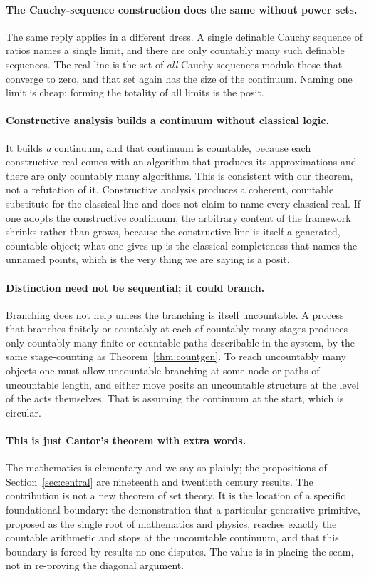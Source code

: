 \documentclass[11pt,a4paper]{article}
\theoremstyle{definition}
\theoremstyle{remark}
\begin{document}
\paragraph{The Cauchy-sequence construction does the same without power sets.}
The same reply applies in a different dress. A single definable Cauchy sequence
of ratios names a single limit, and there are only countably many such definable
sequences. The real line is the set of \emph{all} Cauchy sequences modulo those
that converge to zero, and that set again has the size of the continuum. Naming
one limit is cheap; forming the totality of all limits is the posit.

\paragraph{Constructive analysis builds a continuum without classical logic.}
It builds \emph{a} continuum, and that continuum is countable, because each
constructive real comes with an algorithm that produces its approximations and
there are only countably many algorithms. This is consistent with our theorem,
not a refutation of it. Constructive analysis produces a coherent, countable
substitute for the classical line and does not claim to name every classical
real. If one adopts the constructive continuum, the arbitrary content of the
framework shrinks rather than grows, because the constructive line is itself a
generated, countable object; what one gives up is the classical completeness that
names the unnamed points, which is the very thing we are saying is a posit.

\paragraph{Distinction need not be sequential; it could branch.}
Branching does not help unless the branching is itself uncountable. A process that
branches finitely or countably at each of countably many stages produces only
countably many finite or countable paths describable in the system, by the same
stage-counting as Theorem~\ref{thm:countgen}. To reach uncountably many objects
one must allow uncountable branching at some node or paths of uncountable length,
and either move posits an uncountable structure at the level of the acts
themselves. That is assuming the continuum at the start, which is circular.

\paragraph{This is just Cantor's theorem with extra words.}
The mathematics is elementary and we say so plainly; the propositions of
Section~\ref{sec:central} are nineteenth and twentieth century results. The
contribution is not a new theorem of set theory. It is the location of a specific
foundational boundary: the demonstration that a particular generative primitive,
proposed as the single root of mathematics and physics, reaches exactly the
countable arithmetic and stops at the uncountable continuum, and that this
boundary is forced by results no one disputes. The value is in placing the seam,
not in re-proving the diagonal argument.
\end{document}

